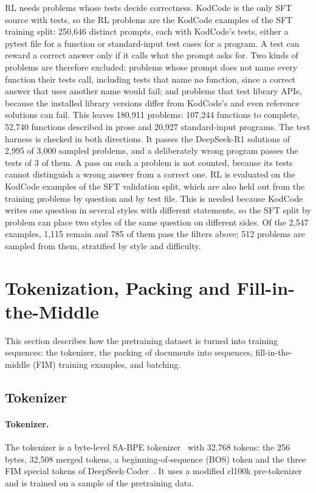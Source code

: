 \documentclass[sigconf,nonacm,balance=false]{acmart}
\begin{document}
RL needs problems whose tests decide correctness. KodCode is the only SFT source with tests, so the RL problems are
the KodCode examples of the SFT training split: 250,646 distinct prompts, each with KodCode's tests, either a pytest
file for a function or standard-input test cases for a program. A test can reward a correct answer
only if it calls what the prompt asks for. Two kinds of problems are therefore excluded: problems whose prompt does
not name every function their tests call, including tests that name no function, since a correct answer that uses
another name would fail; and problems that test library APIs, because the installed library versions differ from
KodCode's and even reference solutions can fail. This leaves 180,911 problems: 107,244 functions to complete, 52,740
functions described in prose and 20,927 standard-input programs. The test harness is checked in both directions. It
passes the DeepSeek-R1 solutions of 2,995
of 3,000 sampled problems, and a deliberately wrong program passes the tests of 3 of them. A pass on such a problem is
not counted, because its tests cannot distinguish a wrong answer from a correct one. RL is evaluated on the KodCode
examples of the SFT validation split, which are also held out from the training problems by question and by test
file. This is needed because KodCode writes one question in several styles with different statements, so the SFT split
by problem can place two styles of the same question on different sides. Of the 2,547 examples, 1,115 remain and 785
of them pass the filters above; 512 problems are sampled from them, stratified by style and difficulty.

\section{Tokenization, Packing and Fill-in-the-Middle}
\label{sec:sequences}

This section describes how the pretraining dataset is turned into training sequences: the tokenizer, the packing of
documents into sequences, fill-in-the-middle (FIM) training examples, and batching.

\subsection{Tokenizer}
\label{sec:tokenizer}

\paragraph{Tokenizer.} The tokenizer is a byte-level SA-BPE tokenizer~\cite{chizhov2026sabpe} with 32,768 tokens:
the 256 bytes, 32,508 merged tokens, a beginning-of-sequence (BOS) token and the three FIM special tokens of
DeepSeek-Coder~\cite{guo2024deepseekcoder}. It uses a modified cl100k pre-tokenizer and is trained on a sample of the
pretraining data.
\end{document}
